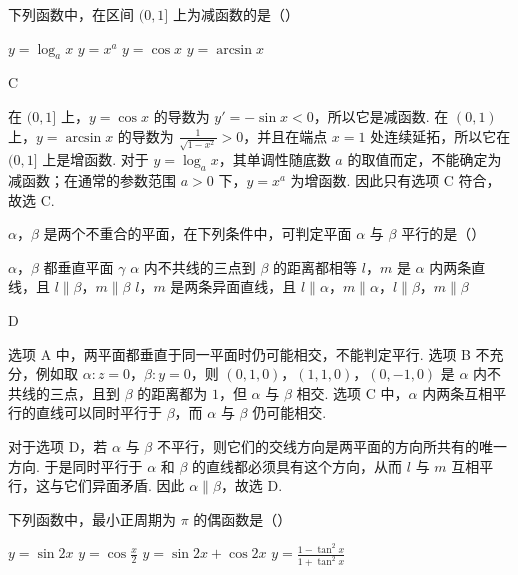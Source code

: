 \documentclass[UTF8,a4paper,oneside,11pt]{ctexbook}
\begin{document}
\begin{problem}
下列函数中，在区间 \((0,1]\) 上为减函数的是（\quad）

\choices
    {\(y = \log_a x\)}
    {\(y = x^a\)}
    {\(y = \cos x\)}
    {\(y = \arcsin x\)}
\end{problem}

\begin{answer}
C
\end{answer}

\begin{solution}
在 \((0,1]\) 上，\(y=\cos x\) 的导数为 \(y'=-\sin x<0\)，所以它是减函数. 在 \((0,1)\) 上，\(y=\arcsin x\) 的导数为 \(\frac{1}{\sqrt{1-x^2}}>0\)，并且在端点 \(x=1\) 处连续延拓，所以它在 \((0,1]\) 上是增函数. 对于 \(y=\log_a x\)，其单调性随底数 \(a\) 的取值而定，不能确定为减函数；在通常的参数范围 \(a>0\) 下，\(y=x^a\) 为增函数. 因此只有选项 C 符合，故选 C.
\end{solution}

\begin{problem}
\(\alpha\)，\(\beta\) 是两个不重合的平面，在下列条件中，可判定平面 \(\alpha\) 与 \(\beta\) 平行的是（\quad）

\choices
    {\(\alpha\)，\(\beta\) 都垂直平面 \(\gamma\)}
    {\(\alpha\) 内不共线的三点到 \(\beta\) 的距离都相等}
    {\(l\)，\(m\) 是 \(\alpha\) 内两条直线，且 \(l \parallel \beta\)，\(m \parallel \beta\)}
    {\(l\)，\(m\) 是两条异面直线，且 \(l \parallel \alpha\)，\(m \parallel \alpha\)，\(l \parallel \beta\)，\(m \parallel \beta\)}
\end{problem}

\begin{answer}
D
\end{answer}

\begin{solution}
选项 A 中，两平面都垂直于同一平面时仍可能相交，不能判定平行. 选项 B 不充分，例如取 \(\alpha:z=0\)，\(\beta:y=0\)，则 \((0,1,0)\)，\((1,1,0)\)，\((0,-1,0)\) 是 \(\alpha\) 内不共线的三点，且到 \(\beta\) 的距离都为 \(1\)，但 \(\alpha\) 与 \(\beta\) 相交. 选项 C 中，\(\alpha\) 内两条互相平行的直线可以同时平行于 \(\beta\)，而 \(\alpha\) 与 \(\beta\) 仍可能相交.

对于选项 D，若 \(\alpha\) 与 \(\beta\) 不平行，则它们的交线方向是两平面的方向所共有的唯一方向. 于是同时平行于 \(\alpha\) 和 \(\beta\) 的直线都必须具有这个方向，从而 \(l\) 与 \(m\) 互相平行，这与它们异面矛盾. 因此 \(\alpha\parallel\beta\)，故选 D.
\end{solution}

\begin{problem}
下列函数中，最小正周期为 \(\pi\) 的偶函数是（\quad）

\choices
    {\(y = \sin 2x\)}
    {\(y = \cos \frac{x}{2}\)}
    {\(y = \sin 2x + \cos 2x\)}
    {\(y = \frac{1 - \tan^2 x}{1 + \tan^2 x}\)}
\end{problem}
\end{document}
